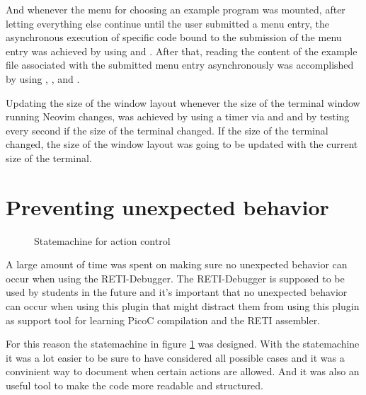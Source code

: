 \documentclass{report}
\begin{document}
And whenever the menu for choosing an example program was mounted, after letting everything else continue until the user submitted a menu entry, the asynchronous execution of specific code bound to the submission of the menu entry was achieved by using  and . After that, reading the content of the example file associated with the submitted menu entry asynchronously was accomplished by using , ,  and . 

Updating the size of the window layout whenever the size of the terminal window running Neovim changes, was achieved by using a timer via  and  and by testing every second if the size of the terminal changed. If the size of the terminal changed, the size of the window layout was going to be updated with the current size of the terminal.

\section{Preventing unexpected behavior}
\label{sec:unexpected behavior}

\begin{figure}
	\centering
	\caption{Statemachine for action control}
	\label{fig:statemachine}
\end{figure}

A large amount of time was spent on making sure no unexpected behavior can occur when using the RETI-Debugger. The RETI-Debugger is supposed to be used by students in the future and it's important that no unexpected behavior can occur when using this plugin that might distract them from using this plugin as support tool for learning PicoC compilation and the RETI assembler.%

For this reason the \alert{statemachine} in figure \ref{fig:statemachine} was designed. With the statemachine it was a lot easier to be sure to have considered all possible cases and it was a convinient way to document when certain actions are allowed. And it was also an useful tool to make the code more readable and structured.
\end{document}

